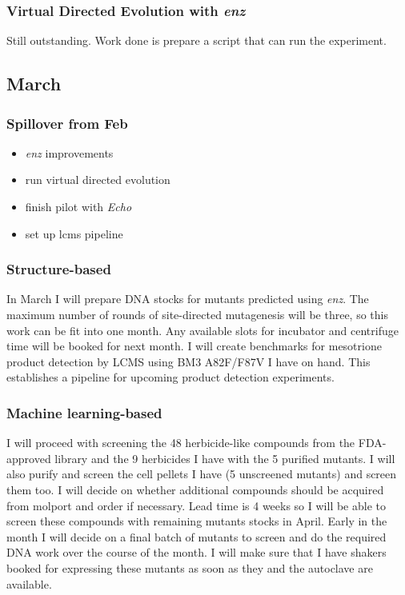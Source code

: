\documentclass{article}
\begin{document}
\subsubsection{Virtual Directed Evolution with \textit{enz}}
Still outstanding. Work done is prepare a script that can run the experiment. 

\subsection{March}
\subsubsection{Spillover from Feb}
\begin{itemize}
	\item \textit{enz} improvements
	\item run virtual directed evolution
	\item finish pilot with \textit{Echo}
	\item set up lcms pipeline
\end{itemize}
\subsubsection{Structure-based}
In March I will prepare DNA stocks for mutants predicted using \textit{enz}. The maximum number of rounds of site-directed mutagenesis will be three, so this work can be fit into one month.  %
Any available slots for incubator and centrifuge time will be booked for next month. %
I will create benchmarks for mesotrione product detection by LCMS using BM3 A82F/F87V I have on hand. This establishes a pipeline for upcoming product detection experiments. %

\subsubsection{Machine learning-based}
I will proceed with screening the 48 herbicide-like compounds from the FDA-approved library and the 9 herbicides I have with the 5 purified mutants. I will also purify and screen the cell pellets I have (5 unscreened mutants) and screen them too.
I will decide on whether additional compounds should be acquired from molport and order if necessary. Lead time is 4 weeks so I will be able to screen these compounds with remaining mutants stocks in April.
Early in the month I will decide on a final batch of mutants to screen and do the required DNA work over the course of the month.  %
I will make sure that I have shakers booked for expressing these mutants as soon as they and the autoclave are available.
\end{document}

